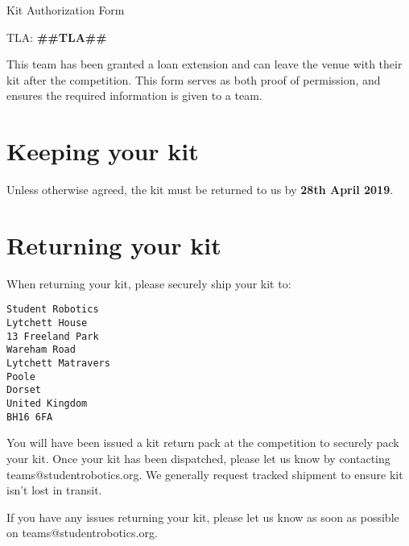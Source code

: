 \documentclass[a4paper, 12pt]{article}
\begin{document}
\setlength{\parskip}{3mm}

\begin{center}

    {\huge{Kit Authorization Form}}

\end{center}

\bigskip

{\Large{TLA: \textbf{##TLA##}}}

\bigskip

This team has been granted a loan extension and can leave the venue with their kit after the competition. This form serves as both proof of permission, and ensures the required information is given to a team.

\section{Keeping your kit}

Unless otherwise agreed, the kit must be returned to us by \textbf{28th April 2019}.

\section{Returning your kit}

When returning your kit, please securely ship your kit to:

\begin{verbatim}
Student Robotics
Lytchett House
13 Freeland Park
Wareham Road
Lytchett Matravers
Poole
Dorset
United Kingdom
BH16 6FA
\end{verbatim}

You will have been issued a kit return pack at the competition to securely pack your kit. Once your kit has been dispatched, please let us know by contacting teams@studentrobotics.org. We generally request tracked shipment to ensure kit isn't lost in transit.

If you have any issues returning your kit, please let us know as soon as possible on teams@studentrobotics.org.
\end{document}
